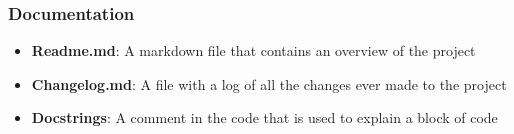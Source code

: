 \begin{frame}
    \frametitle{Documentation}

    \begin{itemize}
        \item \textbf{Readme.md}: A markdown file that contains an overview of 
        the project

        \vspace{1cm}

        \item \textbf{Changelog.md}: A file with a log of all the changes ever 
        made to the project

        \vspace{1cm}

        \item \textbf{Docstrings}: A comment in the code that is used to explain 
        a block of code  
    \end{itemize}

\end{frame}